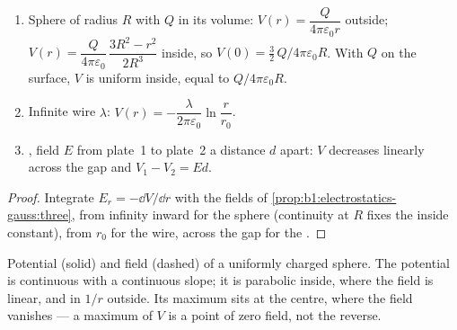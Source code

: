 \begin{proposition}\label{prop:b1:potential-capacitors:classic}
\begin{enumerate}
  \item Sphere of radius $R$ with $Q$ in its volume: $V(r) = \dfrac{Q}{4\pi\varepsilon_0r}$
        outside; $V(r) = \dfrac{Q}{4\pi\varepsilon_0}\,\dfrac{3R^2 - r^2}{2R^3}$
        inside, so $V(0) = \tfrac32\,Q/4\pi\varepsilon_0R$. With $Q$ on the surface,
        $V$ is uniform inside, equal to $Q/4\pi\varepsilon_0R$.
  \item Infinite wire $\lambda$: $V(r) = -\dfrac{\lambda}{2\pi\varepsilon_0}\ln\dfrac{r}{r_0}$.
  \item {}, field $E$ from plate~1 to plate~2 a distance $d$
        apart: $V$ decreases linearly across the gap and $V_1 - V_2 = Ed$.
\end{enumerate}
\end{proposition}

\begin{proof}
Integrate $E_r = -\dd V/\dd r$ with the fields of
\cref{prop:b1:electrostatics-gauss:three}, from infinity inward for the
sphere (continuity at $R$ fixes the inside constant), from $r_0$ for the
wire, across the gap for the .
\end{proof}

\begin{omfigure}

{\small Potential (solid) and field (dashed) of a uniformly charged
sphere. The potential is continuous with a continuous slope; it is
parabolic inside, where the field is linear, and in $1/r$ outside. Its
maximum sits at the centre, where the field vanishes --- a maximum of
$V$ is a point of zero field, not the reverse.}
\end{omfigure}

